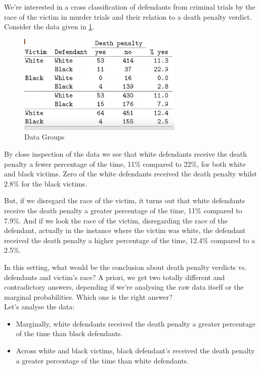 \documentclass{homework}
\begin{document}
We're interested in a cross classification of defendants from criminal trials by the race of the victim in murder trials and their relation to a death penalty verdict. Consider the data given in \ref{fig:Data Groups}. 

\begin{figure}
    \centering
    \includegraphics[scale=.8]{figs/data points_week4.png}
    \caption{Data Groups}
    \label{fig:Data Groups}
\end{figure}

By close inspection of the data we see that white defendants receive the death penalty a fewer percentage of the time, 11\% compared to 22\%, for both white and black victims. Zero of the white defendants received the death penalty whilst 2.8\% for the black victims. 

But, if we disregard the race of the victim, it turns out that white defendants receive the death penalty a greater percentage of the time, 11\% compared to 7.9\%. And if we look the race of the victim, disregarding the race of the defendant, actually in the instance where the victim was white, the defendant received the death penalty a higher percentage of the time, 12.4\% compared to a 2.5\%. 

In this setting, what would be the conclusion about death penalty verdicts vs. defendants and victim's race? A priori, we get two totally different and contradictory answers, depending if we're analysing the raw data itself or the marginal probabilities. Which one is the right answer? \\

Let's analyse the data:

\begin{itemize}
    \item Marginally, white defendants received the death penalty a greater percentage of the time than black defendants.
    \item Across white and black victims, black defendant's received the death penalty a greater percentage of the time than white defendants. 
\end{itemize}
\end{document}

